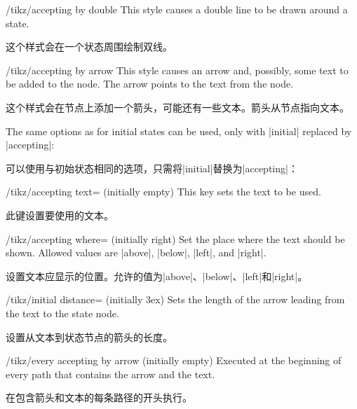 \begin{stylekey}{/tikz/accepting by double}
    This style causes a double line to be drawn around a state.

    这个样式会在一个状态周围绘制双线。
\end{stylekey}

\begin{stylekey}{/tikz/accepting by arrow}
    This style causes an arrow and, possibly, some text to be added to the
    node. The arrow points to the text from the node.

    这个样式会在节点上添加一个箭头，可能还有一些文本。箭头从节点指向文本。

    The same options as for initial states can be used, only with |initial|
    replaced by |accepting|:
    
    可以使用与初始状态相同的选项，只需将|initial|替换为|accepting|：


    \begin{key}{/tikz/accepting text= (initially \normalfont empty)}
        This key sets the text to be used.

        此键设置要使用的文本。


    \end{key}
    \begin{key}{/tikz/accepting where= (initially right)}
        Set the place where the text should be shown. Allowed values are
        |above|, |below|, |left|, and |right|.

        设置文本应显示的位置。允许的值为|above|、|below|、|left|和|right|。
    \end{key}
    \begin{key}{/tikz/initial distance= (initially 3ex)}
        Sets the length of the arrow leading from the text to the state
        node.

        设置从文本到状态节点的箭头的长度。
    \end{key}
    \begin{stylekey}{/tikz/every accepting by arrow (initially \normalfont empty)}
        Executed at the beginning of every path that contains the arrow and the
        text.

        在包含箭头和文本的每条路径的开头执行。
    \end{stylekey}
\begin{codeexample}[preamble={\usetikzlibrary{arrows.meta,automata,positioning}}]
\begin{tikzpicture}
  [shorten >=1pt,node distance=2cm,on grid,>={Stealth[round]},initial text=,
   every state/.style={draw=blue!50,very thick,fill=blue!20},
   accepting/.style=accepting by arrow]


\end{tikzpicture}
\end{codeexample}
\end{stylekey}
